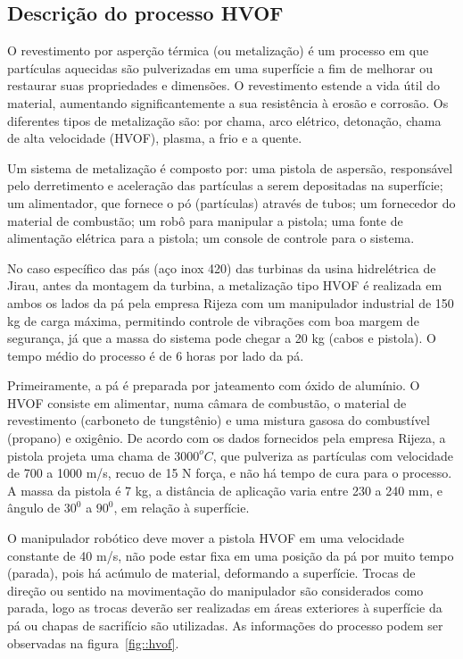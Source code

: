 \subsection{Descrição do processo HVOF}
O revestimento por asperção térmica (ou metalização) é um processo em que
partículas aquecidas são pulverizadas em uma superfície a fim de melhorar ou
restaurar suas propriedades e dimensões. O revestimento estende a vida útil do
material, aumentando significantemente a sua resistência à erosão e corrosão.
Os diferentes tipos de metalização são: por chama, arco elétrico, detonação,
chama de alta velocidade (HVOF), plasma, a frio e a quente.

Um sistema de metalização é composto por: uma pistola de aspersão, responsável
pelo derretimento e aceleração das partículas a serem depositadas na
superfície; um alimentador, que fornece o pó (partículas) através de tubos;
um fornecedor do material de combustão; um robô para manipular a pistola; uma
fonte de alimentação elétrica para a pistola; um console de controle para o
sistema.

No caso específico das pás (aço inox 420) das turbinas da usina hidrelétrica de
Jirau, antes da montagem da turbina, a metalização tipo HVOF é realizada em
ambos os lados da pá pela empresa Rijeza com um manipulador industrial de 150 kg
de carga máxima, permitindo controle de vibrações com boa margem de segurança, já que a massa do
sistema pode chegar a 20 kg (cabos e pistola). O tempo
médio do processo é de 6 horas por lado da pá.

Primeiramente, a pá é preparada por jateamento com óxido de alumínio. O HVOF
consiste em alimentar, numa câmara de combustão, o material de revestimento
(carboneto de tungstênio) e uma mistura gasosa do combustível (propano) e
oxigênio. De acordo com os dados fornecidos pela empresa Rijeza, a pistola
projeta uma chama de $3000^oC$, que pulveriza as partículas com velocidade de
700 a 1000 m/s, recuo de 15 N força, e não há tempo de cura para o processo. A
massa da pistola é 7 kg, a distância de aplicação varia entre 230 a 240 mm, e
ângulo de $30^0$ a $90^0$, em relação à superfície.

O manipulador robótico deve mover a pistola HVOF em uma velocidade constante de
40 m/s, não pode estar fixa em uma posição da pá por muito tempo (parada), pois
há acúmulo de material, deformando a superfície. Trocas de direção ou sentido
na movimentação do manipulador são considerados como parada, logo as trocas
deverão ser realizadas em áreas exteriores à superfície da pá ou chapas de
sacrifício são utilizadas. As informações do processo podem ser observadas na
figura~\ref{fig::hvof}.

